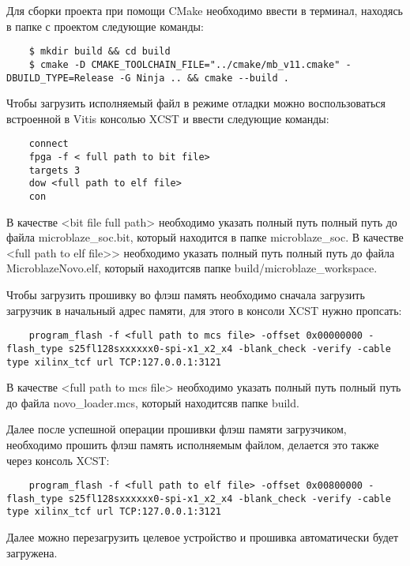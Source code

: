 Для сборки проекта при помощи CMake необходимо ввести в терминал, находясь в папке с проектом следующие команды:

\begin{lstlisting}
    $ mkdir build && cd build
    $ cmake -D CMAKE_TOOLCHAIN_FILE="../cmake/mb_v11.cmake" -DBUILD_TYPE=Release -G Ninja .. && cmake --build .
\end{lstlisting}

Чтобы загрузить исполняемый файл в режиме отладки можно воспользоваться встроенной в Vitis консолью XCST и ввести следующие команды:

\begin{lstlisting}
    connect
    fpga -f < full path to bit file>
    targets 3
    dow <full path to elf file>
    con
\end{lstlisting}

В качестве <bit file full path> необходимо указать полный путь полный путь до файла microblaze\_soc.bit, который находится в папке microblaze\_soc.
В качестве <full path to elf file>> необходимо указать полный путь полный путь до файла MicroblazeNovo.elf, который находитсяв папке build/microblaze\_workspace.

Чтобы загрузить прошивку во флэш память необходимо сначала загрузить загрузчик в начальный адрес памяти, для этого в консоли XCST нужно пропсать:

\begin{lstlisting}
    program_flash -f <full path to mcs file> -offset 0x00000000 -flash_type s25fl128sxxxxxx0-spi-x1_x2_x4 -blank_check -verify -cable type xilinx_tcf url TCP:127.0.0.1:3121
\end{lstlisting}

В качестве <full path to mcs file> необходимо указать полный путь полный путь до файла novo\_loader.mcs, который находитсяв папке build.

Далее после успешной операции прошивки флэш памяти загрузчиком, необходимо прошить флэш память исполняемым файлом, делается это также через консоль XCST: 

\begin{lstlisting}
    program_flash -f <full path to elf file> -offset 0x00800000 -flash_type s25fl128sxxxxxx0-spi-x1_x2_x4 -blank_check -verify -cable type xilinx_tcf url TCP:127.0.0.1:3121
\end{lstlisting}

Далее можно перезагрузить целевое устройство и прошивка автоматически будет загружена. 
